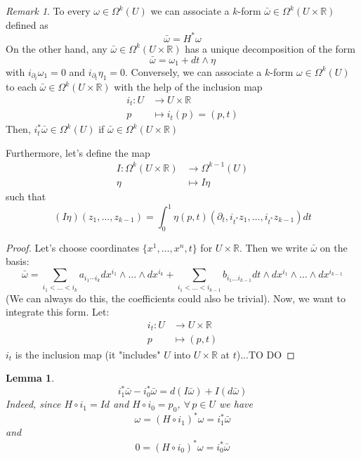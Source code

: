 \documentclass[a4paper,11pt,titlepage]{article}
\numberwithin{equation}{section}
\newtheorem{lemma}[theorem]{Lemma}
\theoremstyle{definition}
\theoremstyle{remark}
\newtheorem{remark}[theorem]{Remark}
\newcommand{\rfield}{\mathbb{R}}
\begin{document}
\begin{remark}
  To every $\omega \in \Omega^k(U)$ we can associate a $k$-form $\bar\omega \in \Omega^k(U \times \rfield)$ defined as
  \begin{equation}
    \bar\omega = H^* \omega
  \end{equation}
  On the other hand, any $\bar \omega \in \Omega^k(U \times \rfield)$ has a unique decomposition of the form
  \begin{equation}
    \bar \omega = \omega_1 + dt \wedge \eta
  \end{equation}
  with $i_{\partial_t} \omega_1 = 0$ and $i_{\partial_t} \eta_1 = 0$.
  Conversely, we can associate a $k$-form $\omega \in \Omega^k(U)$ to each $\bar \omega \in \Omega^k(U \times \rfield)$ with the help of the inclusion map
  \begin{align}
    i_t \colon U &\rightarrow U \times \rfield \\
    p &\mapsto i_t(p) = (p,t)\nonumber
  \end{align}
  Then, $i_t^* \bar \omega \in \Omega^k(U)$ if $\bar \omega \in \Omega^k(U \times \rfield)$

  Furthermore, let's define the map
  \begin{align}
    I \colon \Omega^k(U \times \rfield) &\rightarrow \Omega^{k-1}(U) \\
    \eta &\mapsto I\eta \nonumber
  \end{align}
  such that $$(I\eta)(z_1, \ldots, z_{k-1}) = \int_0^1 \eta(p, t)(\partial_t, i_{t^*}z_1, \ldots, i_{t^*}z_{k-1})dt$$
\end{remark}

\begin{proof}
  Let's choose coordinates $\{x^1, \ldots, x^n, t\}$ for $U \times \rfield$. Then we write $\bar \omega$ on the basis:
  $$\bar \omega = \sum\limits_{i_1 < \ldots < i_k} a_{i_1 \cdots i_k} dx^{i_1} \wedge \ldots \wedge dx^{i_k} + \sum_{i_1 < \ldots < i_{k-1}} b_{i_1 \ldots i_{k-1}} dt \wedge dx^{i_1} \wedge \ldots \wedge dx^{i_{k-1}}$$
  (We can always do this, the coefficients could also be trivial).
  Now, we want to integrate this form. Let:
  \begin{align*}
    i_t \colon U &\rightarrow U \times \rfield \\
    p &\mapsto (p, t)
  \end{align*}
  $i_t$ is the inclusion map (it "includes" $U$ into $U \times \rfield$ at $t$)...TO DO
\end{proof}

\begin{lemma}
  \begin{equation}
    i_1^* \bar \omega - i_0^* \bar \omega = d(I \bar \omega) + I(d\bar \omega)
  \end{equation}
  Indeed, since $H \circ i_1 = Id$ and $H \circ i_0 = p_0$, $\forall \, p \in U$ we have
  $$\omega = (H \circ i_1)^* \omega = i_1^* \bar \omega$$
  and
  $$0 = (H \circ i_0)^* \omega = i_0^* \bar \omega$$
\end{lemma}
\end{document}
